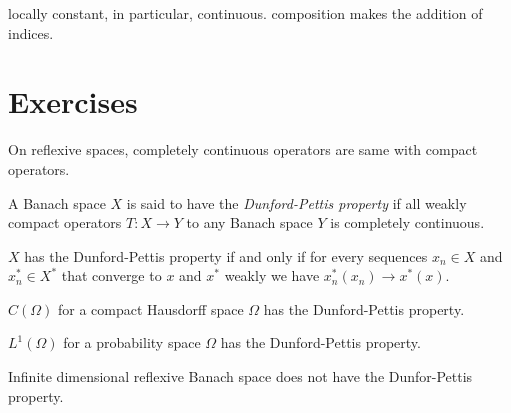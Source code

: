 \documentclass{../../large}
\begin{document}
\begin{prb}
locally constant, in particular, continuous.
composition makes the addition of indices.
\end{prb}


\section{}




\section*{Exercises}

\begin{prb}
On reflexive spaces, completely continuous operators are same with compact operators.
\end{prb}


\begin{prb}
A Banach space $X$ is said to have the \emph{Dunford-Pettis property} if all weakly compact operators $T:X\to Y$ to any Banach space $Y$ is completely continuous.
\begin{parts}
\item $X$ has the Dunford-Pettis property if and only if for every sequences $x_n\in X$ and $x^*_n\in X^*$ that converge to $x$ and $x^*$ weakly we have $x^*_n(x_n)\to x^*(x)$.
\item $C(\Omega)$ for a compact Hausdorff space $\Omega$ has the Dunford-Pettis property.
\item $L^1(\Omega)$ for a probability space $\Omega$ has the Dunford-Pettis property.
\item Infinite dimensional reflexive Banach space does not have the Dunfor-Pettis property.
\end{parts}
\end{prb}
\end{document}
